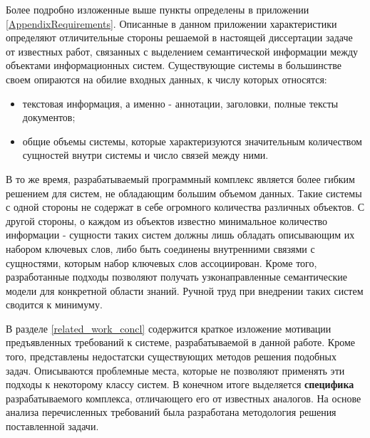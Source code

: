 Более подробно изложенные выше пункты определены в приложении {\ref{AppendixRequirements}}. Описанные в данном приложении характеристики определяют отличительные стороны решаемой в настоящей диссертации задаче от известных работ, связанных с выделением семантической информации между объектами информационных систем. Существующие системы в большинстве своем опираются на обилие входных данных, к числу которых относятся:
\begin{itemize}
    \item текстовая информация, а именно - аннотации, заголовки, полные тексты документов;
    \item общие объемы системы, которые характеризуются значительным количеством сущностей внутри системы и число связей между ними.
\end{itemize}

В то же время, разрабатываемый программный комплекс является более гибким решением для систем, не обладающим большим объемом данных. Такие системы с одной стороны не содержат в себе огромного количества различных объектов. С другой стороны, о каждом из объектов известно минимальное количество информации - сущности таких систем должны лишь обладать описывающим их набором ключевых слов, либо быть соединены внутренними связями с сущностями, которым набор ключевых слов ассоциирован. Кроме того, разработанные подходы позволяют получать узконаправленные семантические модели для конкретной области знаний. Ручной труд при внедрении таких систем сводится к минимуму.

В разделе {\ref{related_work_concl}} содержится краткое изложение мотивации предъявленных требований к системе, разрабатываемой в данной работе. Кроме того, представлены недостатски существующих методов решения подобных задач. Описываются проблемные места, которые не позволяют применять эти подходы к некоторому классу систем. В конечном итоге выделяется \textbf{специфика} разрабатываемого комплекса, отличающего его от известных аналогов. На основе анализа перечисленных требований была разработана методология решения поставленной задачи.

